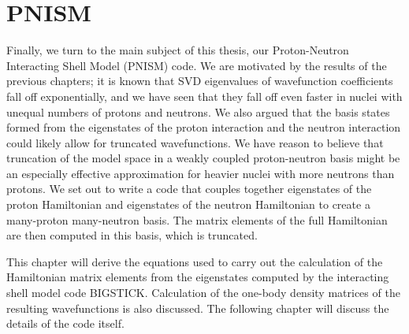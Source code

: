 \chapter{PNISM}
\label{chap:PNISM}

Finally, we turn to the main subject of this thesis, our Proton-Neutron Interacting
Shell Model (PNISM) code. We are motivated by the results of the previous chapters; 
it is known that SVD eigenvalues of wavefunction coefficients fall off exponentially,
and we have seen that they fall off even faster in nuclei with unequal numbers
of protons and neutrons. We also argued that the basis states formed from
the eigenstates of the proton interaction and the neutron interaction could likely
allow for truncated wavefunctions. We have reason to believe that truncation of 
the model space in a weakly coupled proton-neutron basis might be an especially effective
approximation for heavier nuclei with more neutrons than protons. 
We set out to write a code that couples together eigenstates of the proton Hamiltonian and 
eigenstates of the neutron Hamiltonian to create a many-proton many-neutron basis.
The matrix elements of the full Hamiltonian are then computed in this basis, which is
truncated.

This chapter will derive the equations used to carry out the calculation of the
Hamiltonian matrix elements from the eigenstates computed by the interacting 
shell model code BIGSTICK. Calculation of the one-body density matrices of the
resulting wavefunctions is also discussed. The following chapter will discuss
the details of the code itself.

